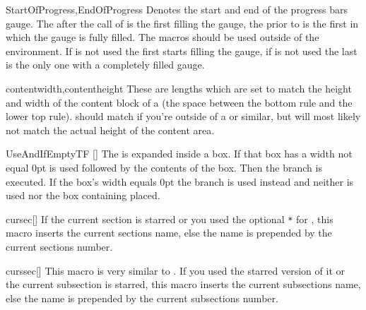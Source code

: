 \begin{describemacro}{StartOfProgress,EndOfProgress}
  Denotes the start and end of the progress bars gauge. The  after
  the call of  is the first  filling the gauge,
  the  prior to  is the first  in which
  the gauge is fully filled. The macros should be used outside of the
   environment. If  is not used the first
   starts filling the gauge, if  is not used the
  last  is the only one with a completely filled gauge.
\end{describemacro}

\begin{describemacro}{contentwidth,contentheight}
  These are lengths which are set to match the height and width of the content
  block of a  (the space between the bottom rule and the lower top
  rule).  should match  if you're outside of a
   or similar, but  will most likely not match the
  actual height of the content area.
\end{describemacro}

\begin{describemacro}{UseAndIfEmptyTF}%
  []
  The  is expanded inside a box. If that box has a width not equal 0pt
   is used followed by the contents of the box. Then the 
  branch is executed. If the box's width equals 0pt the  branch is
  used instead and neither  is used nor the box containing 
  placed.
\end{describemacro}

\begin{describemacro}{cursec}[\meta{*}]
  If the current section is starred or you used the optional \texttt{*} for
  , this macro inserts the current sections name, else the name is
  prepended by the current sections number.
\end{describemacro}

\begin{describemacro}{curssec}[\meta{*}]
  This macro is very similar to . If you used the starred version of
  it or the current subsection is starred, this macro inserts the current
  subsections name, else the name is prepended by the current subsections
  number.
\end{describemacro}


